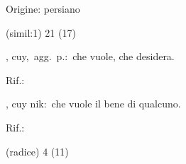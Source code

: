 \begin{glossario}{Origine: persiano}
\begin{subvocedue}
\item[(simil:1)]   21 (17)
\end{subvocedue}
\item[{\color{colorlowref}\spzrl{^gUy}},] {\sf cuy},\ agg.\ p.:\ che vuole, che desidera.
\begin{subvocedue}
\item[Rif.:] 
\end{subvocedue}
\begin{subvocedue}
\item[\subglossariobullet] , {\sf cuy nik}:\ che vuole il bene di qualcuno.
\begin{subvocedue}
\item[Rif.:] 
\end{subvocedue}
\item[(radice)]   4 (11)
\end{subvocedue}



\end{glossario}
